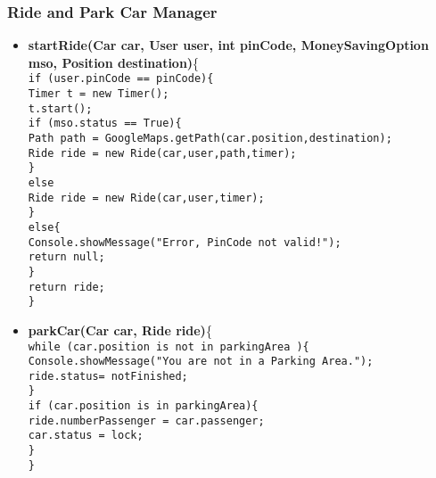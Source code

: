 \subsubsection{Ride and Park Car Manager}
\begin{itemize}
\item \textbf{startRide(Car car, User user, int pinCode, MoneySavingOption mso, Position destination)}\{\\
\texttt{if (user.pinCode == pinCode)\{\\
\tab Timer t = new Timer(); \\ 
\tab t.start();\\
\tab if (mso.status == True)\{\\
\tab \tab Path path = GoogleMaps.getPath(car.position,destination);\\
\tab \tab Ride ride = new Ride(car,user,path,timer);\\
\tab \tab \}\\
\tab else\\
\tab \tab Ride ride = new Ride(car,user,timer);\\
\tab \}\\
else\{\\
\tab Console.showMessage("Error, PinCode not valid!");\\
\tab return null;\\
\tab \}\\
return ride;\\
\}\\
}

\item \textbf{parkCar(Car car, Ride ride)}\{\\
\texttt{while (car.position is not in parkingArea )\{\\ 
\tab Console.showMessage("You are not in a Parking Area.");\\
\tab ride.status= notFinished;\\
\tab \}\\
if (car.position is in parkingArea)\{\\
\tab ride.numberPassenger = car.passenger;\\
\tab car.status = lock;\\
\tab\}\\
\}
 }
 

\end{itemize}
